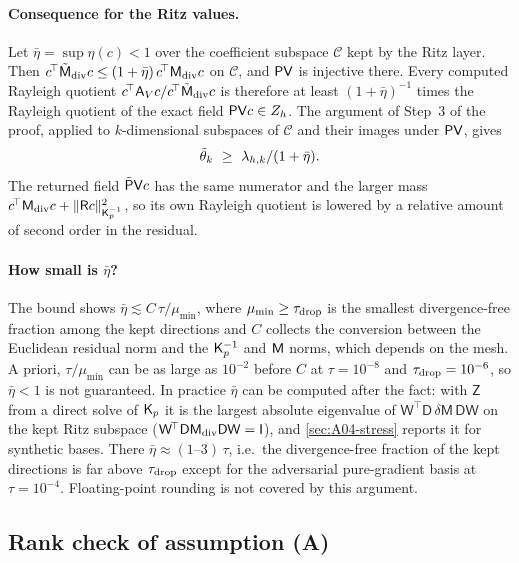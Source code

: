 \paragraph{Consequence for the Ritz values.}
Let $\bar\eta=\sup\eta(c)<1$ over the coefficient subspace $\mathcal C$ kept by the Ritz layer.
Then $c^{\!\top}\tilde{\mathsf M}_{\rm div}c\le(1+\bar\eta)\,c^{\!\top}\Mdiv c$ on $\mathcal C$, and $\mathsf{P}\mathsf{V}$ is injective there.
Every computed Rayleigh quotient $c^{\!\top}\Av c/c^{\!\top}\tilde{\mathsf M}_{\rm div}c$ is therefore at least $(1+\bar\eta)^{-1}$ times the Rayleigh quotient of the exact field $\mathsf{P}\mathsf{V} c\in Z_h$.
The argument of Step~3 of the proof, applied to $k$-dimensional subspaces of $\mathcal C$ and their images under $\mathsf{P}\mathsf{V}$, gives
\[
  \tilde\theta_k\ \ge\ \lamh_k/(1+\bar\eta).
\]
The returned field $\tilde{\mathsf{P}}\mathsf{V} c$ has the same numerator and the larger mass $c^{\!\top}\Mdiv c+\|\mathsf Rc\|_{\Kp^{-1}}^2$, so its own Rayleigh quotient is lowered by a relative amount of second order in the residual.

\paragraph{How small is $\bar\eta$?}
The bound shows $\bar\eta\lesssim C\,\tau/\mu_{\min}$, where $\mu_{\min}\ge\tau_{\rm drop}$ is the smallest divergence-free fraction among the kept directions and $C$ collects the conversion between the Euclidean residual norm and the $\Kp^{-1}$ and $\mathsf{M}$ norms, which depends on the mesh.
A priori, $\tau/\mu_{\min}$ can be as large as $10^{-2}$ before $C$ at $\tau=10^{-8}$ and $\tau_{\rm drop}=10^{-6}$, so $\bar\eta<1$ is not guaranteed.
In practice $\bar\eta$ can be computed after the fact: with $\mathsf Z$ from a direct solve of $\Kp$ it is the largest absolute eigenvalue of $\mathsf W^{\!\top}\mathsf D\,\delta\mathsf M\,\mathsf D\mathsf W$ on the kept Ritz subspace ($\mathsf W^{\!\top}\mathsf D\Mdiv\mathsf D\mathsf W=\mathsf I$), and \cref{sec:A04-stress} reports it for synthetic bases.
There $\bar\eta\approx(1\text{--}3)\,\tau$, i.e.\ the divergence-free fraction of the kept directions is far above $\tau_{\rm drop}$ except for the adversarial pure-gradient basis at $\tau=10^{-4}$.
Floating-point rounding is not covered by this argument.

\subsection{Rank check of assumption (A)}\label{sec:A04-rank}

